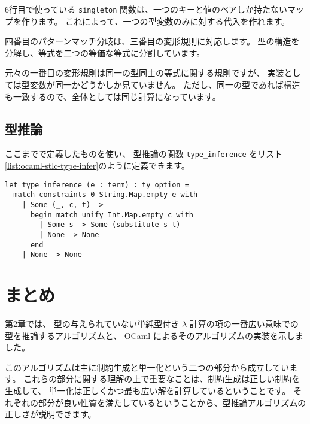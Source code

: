 6行目で使っている \texttt{singleton} 関数は、一つのキーと値のペアしか持たないマップを作ります。
これによって、一つの型変数のみに対する代入を作れます。

四番目のパターンマッチ分岐は、三番目の変形規則に対応します。
型の構造を分解し、等式を二つの等価な等式に分割しています。

元々の一番目の変形規則は同一の型同士の等式に関する規則ですが、
実装としては型変数が同一かどうかしか見ていません。
ただし、同一の型であれば構造も一致するので、全体としては同じ計算になっています。

\subsection{型推論}

ここまでで定義したものを使い、
型推論の関数 \texttt{type\_inference} をリスト\ref{list:ocaml-stlc-type-infer}のように定義できます。

\begin{lstlisting}[caption=型推論, label=list:ocaml-stlc-type-infer]
let type_inference (e : term) : ty option =
  match constraints 0 String.Map.empty e with
    | Some (_, c, t) ->
      begin match unify Int.Map.empty c with
        | Some s -> Some (substitute s t)
        | None -> None
      end
    | None -> None
\end{lstlisting}

\section{まとめ}

第2章では、
型の与えられていない単純型付き $\lambda$ 計算の項の一番広い意味での型を推論するアルゴリズムと、
OCaml によるそのアルゴリズムの実装を示しました。

このアルゴリズムは主に制約生成と単一化という二つの部分から成立しています。
これらの部分に関する理解の上で重要なことは、制約生成は正しい制約を生成して、
単一化は正しくかつ最も広い解を計算しているということです。
それぞれの部分が良い性質を満たしているということから、型推論アルゴリズムの正しさが説明できます。

